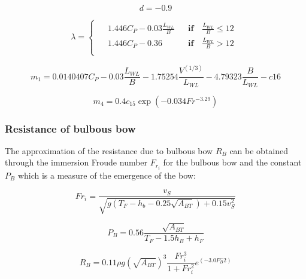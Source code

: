 \begin{equation}
    \label{eqn:d}
    d = -0.9
\end{equation}

\begin{equation}
    \label{eqn:lambda}
    \lambda = 
    \begin{cases}
        \begin{aligned}
            &1.446C_P - 0.03\frac{L_{WL}}{B} && \textbf{if} \quad \frac{L_{WL}}{B} \leqslant 12 \\
            &1.446C_P - 0.36 && \textbf{if} \quad \frac{L_{WL}}{B} > 12 \\
        \end{aligned}
    \end{cases}
\end{equation}

\begin{equation}
    \label{eqn:m1}
    m_1 = 0.0140407C_P - 0.03\frac{L_{WL}}{B} - 1.75254\frac{V^{(1/3)}}{L_{WL}} - 4.79323\frac{B}{L_{WL}} - c{16}
\end{equation}

\begin{equation}
    \label{eqn:m4}
    m_4 = 0.4 c_{15} \exp{(-0.034Fr^{-3.29})}
\end{equation}

\subsubsection*{Resistance of bulbous bow}

The approximation of the resistance due to bulbous bow $R_B$ can be obtained through the immersion Froude number $F_{r_i}$ for the bulbous bow and the constant $P_B$ which is a measure of the emergence of the bow: 

\begin{equation}
    \label{Fr_immersion}
    Fr_i = \frac{v_S}{\sqrt{g(T_F-h_b-0.25 \sqrt{A_{BT}})+0.15v_S^2}}
\end{equation}

\begin{equation}
    \label{Pb}
    P_B = 0.56 \frac{\sqrt{A_{BT}}}{T_F-1.5h_B+h_F}
\end{equation}

\begin{equation}
    \label{eqn:Rbulb}
    R_B = 0.11 \rho g (\sqrt{A_{BT}})^3 \frac{Fr_{i}^3}{1+Fr_{i}^2}e^{(-3.0P_B^-2)}
\end{equation}

